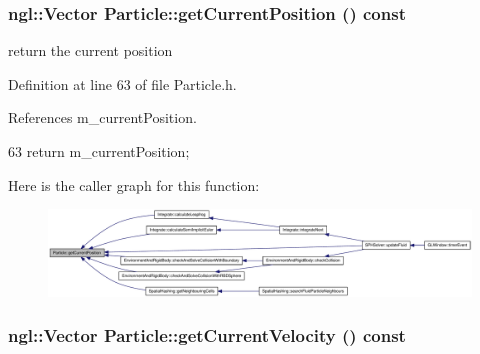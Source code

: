 \hypertarget{class_particle_a7bb9e571a782e273da7efcf77b3b578f}{
\subsubsection[{getCurrentPosition}]{\setlength{\rightskip}{0pt plus 5cm}ngl::Vector Particle::getCurrentPosition () const}}
\label{class_particle_a7bb9e571a782e273da7efcf77b3b578f}


return the current position 



Definition at line 63 of file Particle.h.



References m\_\-currentPosition.




\begin{DoxyCode}
63 { return m_currentPosition; }
\end{DoxyCode}




Here is the caller graph for this function:\nopagebreak
\begin{figure}[H]
\begin{center}
\leavevmode
\includegraphics[width=420pt]{class_particle_a7bb9e571a782e273da7efcf77b3b578f_icgraph}
\end{center}
\end{figure}


\hypertarget{class_particle_af19d3d862218eda779fc03d5e1678abe}{
\subsubsection[{getCurrentVelocity}]{\setlength{\rightskip}{0pt plus 5cm}ngl::Vector Particle::getCurrentVelocity () const}}
\label{class_particle_af19d3d862218eda779fc03d5e1678abe}


